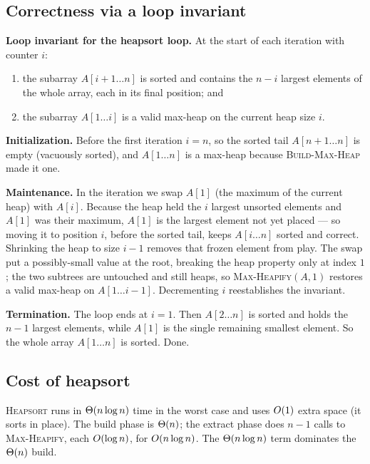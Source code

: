 \subsection{Correctness via a loop invariant}

\begin{formalbox}
\textbf{Loop invariant for the heapsort loop.} At the start of each iteration
with counter $i$:
\begin{enumerate}
\item the subarray $A[i+1 \ldots n]$ is sorted and contains the $n-i$ largest
elements of the whole array, each in its final position; and
\item the subarray $A[1 \ldots i]$ is a valid max-heap on the current heap size
$i$.
\end{enumerate}
\end{formalbox}

\textbf{Initialization.} Before the first iteration $i=n$, so the sorted tail
$A[n+1\ldots n]$ is empty (vacuously sorted), and $A[1\ldots n]$ is a max-heap
because \textsc{Build-Max-Heap} made it one.

\textbf{Maintenance.} In the iteration we swap $A[1]$ (the maximum of the current
heap) with $A[i]$. Because the heap held the $i$ largest unsorted elements and
$A[1]$ was their maximum, $A[1]$ is the largest element not yet placed --- so
moving it to position $i$, before the sorted tail, keeps $A[i\ldots n]$
sorted and correct. Shrinking the heap to size $i-1$ removes that frozen element
from play. The swap put a possibly-small value at the root, breaking the heap
property only at index $1$; the two subtrees are untouched and still heaps, so
\textsc{Max-Heapify}$(A,1)$ restores a valid max-heap on $A[1\ldots i-1]$.
Decrementing $i$ reestablishes the invariant.

\textbf{Termination.} The loop ends at $i=1$. Then $A[2\ldots n]$ is sorted and
holds the $n-1$ largest elements, while $A[1]$ is the single remaining smallest
element. So the whole array $A[1\ldots n]$ is sorted. Done.

\subsection{Cost of heapsort}

\begin{complexitybox}
\textsc{Heapsort} runs in $\Theta(n\log n)$ time in the worst case and uses
$O(1)$ extra space (it sorts in place). The build phase is $\Theta(n)$; the
extract phase does $n-1$ calls to \textsc{Max-Heapify}, each $O(\log n)$, for
$O(n\log n)$. The $\Theta(n\log n)$ term dominates the $\Theta(n)$ build.
\end{complexitybox}


